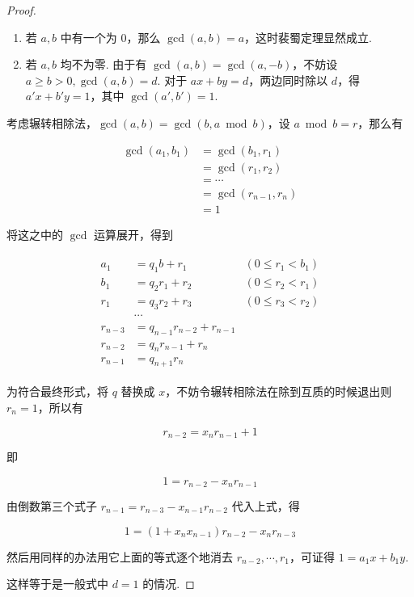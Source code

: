 \documentclass[a4paper]{article}
\begin{document}
\begin{proof}
    \begin{enumerate}
        \item 若 $a,b$ 中有一个为 $0$，那么 $\gcd(a,b)=a$，这时裴蜀定理显然成立.
        \item 若 $a,b$ 均不为零. 由于有 $\gcd(a,b)=\gcd(a,-b)$，不妨设 $a\ge b>0,\gcd(a,b)=d$. 对于
              $ax+by=d$，两边同时除以 $d$，得 $a'x+b'y=1$，其中 $\gcd(a',b')=1$.
    \end{enumerate}

    考虑辗转相除法，$\gcd(a,b)=\gcd(b,a\bmod b)$，设 $a\bmod b = r$，那么有

    \begin{equation*}
        \begin{split}
            \gcd(a_1,b_1)&=\gcd(b_1,r_1)\\
            &=\gcd(r_1,r_2)\\
            &=\cdots\\
            &=\gcd(r_{n-1},r_n)\\
            &=1
        \end{split}
    \end{equation*}

    将这之中的 $\gcd$ 运算展开，得到

    \begin{equation*}
        \begin{split}
            \begin{aligned}
                a_1     & = q_1b+r_1               & (0\leq r_1<b_1) \\
                b_1     & = q_2r_1+r_2             & (0\leq r_2<r_1) \\
                r_1     & = q_3r_2+r_3             & (0\leq r_3<r_2) \\
                        & \cdots                                     \\
                r_{n-3} & = q_{n-1}r_{n-2}+r_{n-1}                   \\
                r_{n-2} & = q_nr_{n-1}+r_n                           \\
                r_{n-1} & = q_{n+1}r_n
            \end{aligned}
        \end{split}
    \end{equation*}

    为符合最终形式，将 $q$ 替换成 $x$，不妨令辗转相除法在除到互质的时候退出则 $r_n=1$，所以有

    $$
        r_{n-2}=x_nr_{n-1}+1
    $$

    即

    $$
        1=r_{n-2}-x_nr_{n-1}
    $$

    由倒数第三个式子 $r_{n-1}=r_{n-3}-x_{n-1}r_{n-2}$ 代入上式，得

    $$
        1=(1+x_nx_{n-1})r_{n-2}-x_nr_{n-3}
    $$

    然后用同样的办法用它上面的等式逐个地消去 $r_{n-2},\cdots,r_1$，可证得 $1=a_1x+b_1y$.

    这样等于是一般式中 $d=1$ 的情况.
\end{proof}
\end{document}
